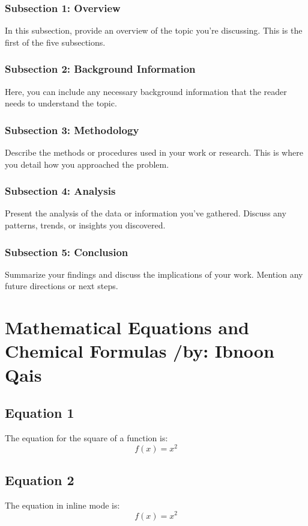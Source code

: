 \documentclass[12pt,a4paper]{article}
\begin{document}
	\subsubsection{Subsection 1: Overview}
	In this subsection, provide an overview of the topic you're discussing. This is the first of the five subsections.
	
	\subsubsection{Subsection 2: Background Information}
	Here, you can include any necessary background information that the reader needs to understand the topic.
	
	\subsubsection{Subsection 3: Methodology}
	Describe the methods or procedures used in your work or research. This is where you detail how you approached the problem.
	
	\subsubsection{Subsection 4: Analysis}
	Present the analysis of the data or information you've gathered. Discuss any patterns, trends, or insights you discovered.
	
	\subsubsection{Subsection 5: Conclusion}
	Summarize your findings and discuss the implications of your work. Mention any future directions or next steps.
	\newpage
	\section{Mathematical Equations and Chemical Formulas /by: Ibnoon Qais}
	\subsection{Equation 1}
	The equation for the square of a function is:
	\begin{equation}
		f(x) = x^2  
	\end{equation}
	
	\subsection{Equation 2}
	The equation in inline mode is:
	\[
	f(x) = x^2
	\]
	
\end{document}
